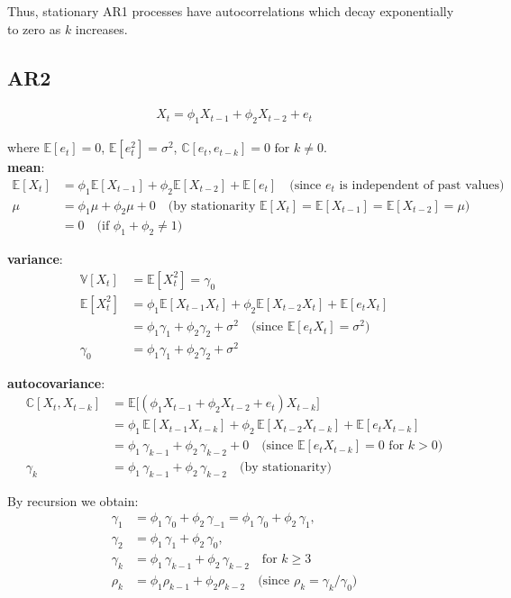 \documentclass[latex/main.tex]{subfiles}
\begin{document}
Thus, stationary AR1 processes have autocorrelations which decay exponentially to zero as $k$ increases.


\subsection*{AR2}

\begin{align}
    X_t = \phi_1 X_{t-1} + \phi_2 X_{t-2} + e_t \label{eq:ar2-1}
\end{align}

where $\mathbb{E}[e_t] = 0$, $\mathbb{E}[e_t^2] = \sigma^2$, $\mathbb{C}[e_t, e_{t-k}] = 0\text{ for }k\ne0$.\\

\textbf{mean}:
\begin{align}
    \mathbb{E}[X_t] &= \phi_1\mathbb{E}[X_{t-1}] + \phi_2\mathbb{E}[X_{t-2}] + \mathbb{E}[e_t] \quad\text{(since $e_t$ is independent of past values)}\\
    \mu &= \phi_1 \mu + \phi_2 \mu + 0 \quad\text{(by stationarity $\mathbb{E}[X_t]=\mathbb{E}[X_{t-1}]
    =\mathbb{E}[X_{t-2}]=\mu$)}\\
    &= 0 \quad\text{(if $\phi_1+\phi_2\neq 1$)}
\end{align}

\textbf{variance}:
\begin{align}
    \mathbb{V}[X_t] &= \mathbb{E}[X_t^2] = \gamma_0\\
    \mathbb{E}[X_t^2] &= \phi_1 \mathbb{E}[X_{t-1}X_t] + \phi_2 \mathbb{E}[X_{t-2}X_t] + \mathbb{E}[e_tX_t]\\
    &= \phi_1 \gamma_1 + \phi_2 \gamma_2 + \sigma^2 \quad\text{(since $\mathbb{E}[e_tX_t]=\sigma^2$)}\\
    \gamma_0 &= \phi_1\gamma_1 + \phi_2\gamma_2 + \sigma^2
\end{align}

\textbf{autocovariance}:
\begin{align}
    \mathbb{C}[X_t, X_{t-k}] &= \mathbb{E}\Big[(\phi_1 X_{t-1} + \phi_2 X_{t-2} + e_t) X_{t-k}\Big] \\
    &= \phi_1\,\mathbb{E}[X_{t-1}X_{t-k}] + \phi_2\,\mathbb{E}[X_{t-2}X_{t-k}] + \mathbb{E}[e_tX_{t-k}]\\
    &= \phi_1\,\gamma_{k-1} + \phi_2\,\gamma_{k-2} + 0 \quad \text{(since $\mathbb{E}[e_tX_{t-k}] = 0$ for $k>0$)}\\
    \gamma_k &= \phi_1\,\gamma_{k-1} + \phi_2\,\gamma_{k-2} \quad \text{(by stationarity)}
\end{align}

By recursion we obtain:
\begin{align}
    \gamma_1 &= \phi_1\,\gamma_0 + \phi_2\,\gamma_{-1} = \phi_1\,\gamma_0 + \phi_2\,\gamma_1,\\[1em]
    \gamma_2 &= \phi_1\,\gamma_1 + \phi_2\,\gamma_0,\\[1em]
    \gamma_k &= \phi_1\,\gamma_{k-1} + \phi_2\,\gamma_{k-2} \quad \text{for } k\geq 3\\
    \rho_k &= \phi_1 \rho_{k-1} + \phi_2 \rho_{k-2} \quad \text{(since $\rho_k = \gamma_k / \gamma_0$)}
\end{align}
\end{document}

